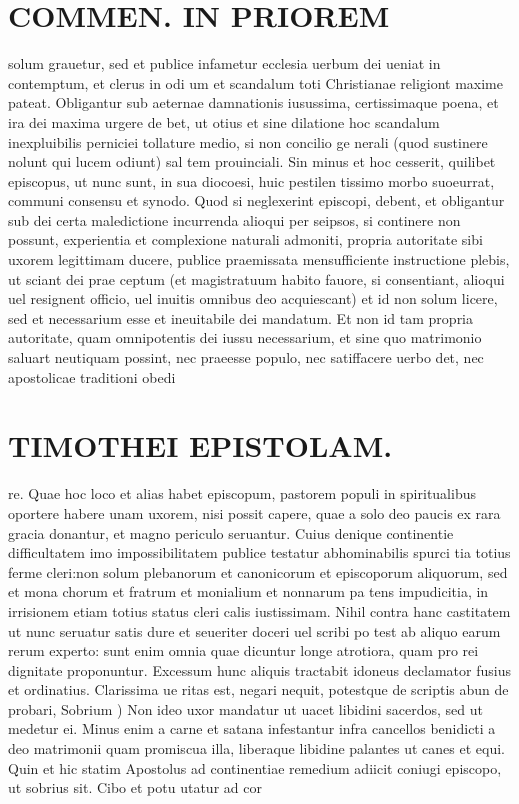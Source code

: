 \documentclass{article}
\begin{document}
\begin{pages}
\section*{COMMEN. IN PRIOREM }
\marginpar{[ p.72 ]}\pstart solum grauetur, sed et publice infametur ecclesia uerbum dei ueniat in contemptum, et clerus in odi um et scandalum toti Christianae religiont maxime pateat. Obligantur sub aeternae damnationis iusussima, certissimaque poena, et ira dei maxima urgere de bet, ut otius et sine dilatione hoc scandalum inexpluibilis perniciei tollature medio, si non concilio ge nerali (quod sustinere nolunt qui lucem odiunt) sal tem prouinciali. Sin minus et hoc cesserit, quilibet episcopus, ut nunc sunt, in sua diocoesi, huic pestilen tissimo morbo suoeurrat, communi consensu et synodo. Quod si neglexerint episcopi, debent, et obligantur sub dei certa maledictione incurrenda alioqui per seipsos, si continere non possunt, experientia et complexione naturali admoniti, propria autoritate sibi uxorem legittimam ducere, publice praemissata mensufficiente instructione plebis, ut sciant dei prae ceptum (et magistratuum habito fauore, si consentiant, alioqui uel resignent officio, uel inuitis omnibus deo acquiescant) et id non solum licere, sed et necessarium esse et ineuitabile dei mandatum. Et non id tam propria autoritate, quam omnipotentis dei iussu necessarium, et sine quo matrimonio saluart neutiquam possint, nec praeesse populo, nec satiffacere uerbo det, nec apostolicae traditioni obedi  \pend
\section*{TIMOTHEI EPISTOLAM. }
\marginpar{[ p.73 ]}\pstart re. Quae hoc loco et alias habet episcopum, pastorem populi in spiritualibus oportere habere unam uxorem, nisi possit capere, quae a solo deo paucis ex rara gracia donantur, et magno periculo seruantur. Cuius denique continentie difficultatem imo impossibilitatem publice testatur abhominabilis spurci tia totius ferme cleri:non solum plebanorum et canonicorum et episcoporum aliquorum, sed et mona chorum et fratrum et monialium et nonnarum pa tens impudicitia, in irrisionem etiam totius status cleri calis iustissimam. Nihil contra hanc castitatem ut nunc seruatur satis dure et seueriter doceri uel scribi po test ab aliquo earum rerum experto: sunt enim omnia quae dicuntur longe atrotiora, quam pro rei dignitate proponuntur. Excessum hunc aliquis tractabit idoneus declamator fusius et ordinatius. Clarissima ue ritas est, negari nequit, potestque de scriptis abun de probari,  \pend\pstart Sobrium ) Non ideo uxor mandatur ut uacet libidini sacerdos, sed ut medetur ei. Minus enim a carne et satana infestantur infra cancellos benidicti a deo matrimonii quam promiscua illa, liberaque libidine palantes ut canes et equi. Quin et hic statim Apostolus ad continentiae remedium adiicit coniugi episcopo, ut sobrius sit. Cibo et potu utatur ad cor\pend

\end{pages}
\end{document}
